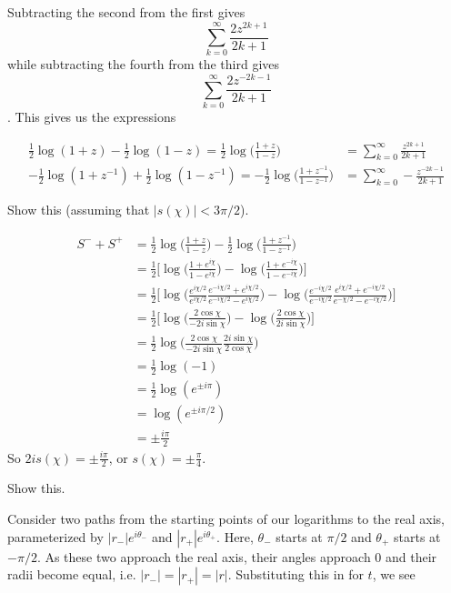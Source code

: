 \documentclass[../the-road-to-reality.tex]{subfiles}
\begin{document}
\begin{questions}
\begin{solution}
	Subtracting the second from the first gives$$\sum_{k=0}^{\infty}\frac{2z^{2k+1}}{2k+1}$$while subtracting the fourth from the third gives$$\sum_{k=0}^{\infty}\frac{2z^{-2k-1}}{2k+1}$$. This gives us the expressions

	\begin{align*}
		\frac{1}{2}\log(1+z) - \frac{1}{2}\log(1-z) = \frac{1}{2}\log\Big(\frac{1+z}{1-z}\Big) &= \sum_{k=0}^{\infty}\frac{z^{2k+1}}{2k+1} \\
		-\frac{1}{2}\log(1+z^{-1}) + \frac{1}{2}\log(1-z^{-1}) = -\frac{1}{2}\log\Big(\frac{1+z^{-1}}{1-z^{-1}}\Big) &= \sum_{k=0}^{\infty}-\frac{z^{-2k-1}}{2k+1}
	\end{align*}
\end{solution}

\question Show this (assuming that $|s(\chi)| < 3\pi/2$).

\begin{solution}
	\begin{align*}
		S^{-} + S^{+} &= \frac{1}{2}\log\Big(\frac{1+z}{1-z}\Big) - \frac{1}{2}\log\Big(\frac{1+z^{-1}}{1-z^{-1}}\Big) \\
		&= \frac{1}{2}\Big[\log\Big(\frac{1+e^{i\chi}}{1-e^{i\chi}}\Big) - \log\Big(\frac{1+e^{-i\chi}}{1-e^{-i\chi}}\Big)\Big] \\
		&= \frac{1}{2}\Big[\log\Big(\frac{e^{i\chi/2}}{e^{i\chi/2}}\frac{e^{-i\chi/2} + e^{i\chi/2}}{e^{-i\chi/2} - e^{i\chi/2}}\Big) - \log\Big(\frac{e^{-i\chi/2}}{e^{-i\chi/2}}\frac{e^{i\chi/2} + e^{-i\chi/2}}{e^{-\chi/2} - e^{-i\chi/2}}\Big)\Big] \\
		&= \frac{1}{2}\Big[\log\Big(\frac{2\cos\chi}{-2i\sin\chi}\Big) - \log\Big(\frac{2\cos\chi}{2i\sin\chi}\Big)\Big] \\
		&= \frac{1}{2}\log\Big(\frac{2\cos\chi}{-2i\sin\chi}\frac{2i\sin\chi}{2\cos\chi}\Big) \\
		&= \frac{1}{2}\log(-1) \\
		&= \frac{1}{2}\log(e^{\pm{i}\pi}) \\
		&= \log(e^{\pm{i}\pi/2}) \\
		&= \pm\frac{i\pi}{2} 
	\end{align*}
	So $2is(\chi) = \pm\frac{i\pi}{2}$, or $s(\chi) = \pm\frac{\pi}{4}$.
\end{solution}

\question Show this.

\begin{solution}
	Consider two paths from the starting points of our logarithms to the real axis, parameterized by $|r_{-}|e^{i\theta_{-}}$ and $|r_{+}|e^{i\theta_{+}}$. Here, $\theta_{-}$ starts at $\pi/2$ and $\theta_{+}$ starts at $-\pi/2$. As these two approach the real axis, their angles approach $0$ and their radii become equal, i.e. $|r_{-}| = |r_{+}| = |r|$. Substituting this in for $t$, we see
	

\end{solution}
\end{questions}
\end{document}
